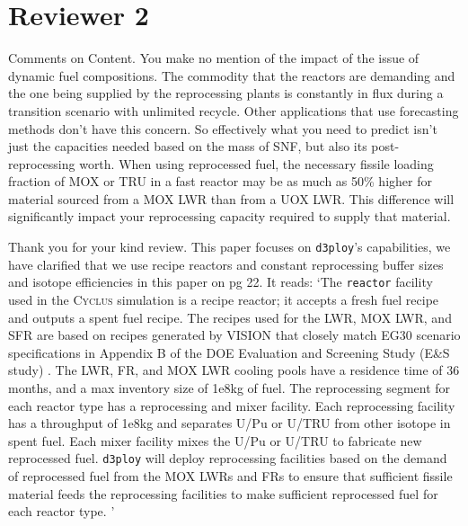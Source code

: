 \documentclass[answers,11pt]{exam}
\newcommand{\Cyclus}{\textsc{Cyclus}\xspace}%
\newcommand{\deploy}{\texttt{d3ploy}\xspace}%
\begin{document}
\section*{Reviewer 2}
\begin{questions}

\question Comments on Content.
You make no mention of the impact of the issue of dynamic fuel compositions. 
The commodity that the reactors are demanding and the one being supplied 
by the reprocessing plants is constantly in flux during a transition 
scenario with unlimited recycle. Other applications that use forecasting 
methods don't have this concern.  So effectively what you need to predict 
isn't just the capacities needed based on the mass of SNF, but also its 
post-reprocessing worth. When using reprocessed fuel, the necessary fissile 
loading fraction of MOX or TRU in a fast reactor may be as much as 50\% 
higher for material sourced from a MOX LWR than from a UOX LWR. 
This difference will significantly impact your reprocessing capacity 
required to supply that material.

\begin{solution}
Thank you for your kind review.
This paper focuses on \deploy's capabilities, we have clarified that we use recipe reactors 
and constant reprocessing buffer sizes and isotope efficiencies in this paper on pg 22. It reads: 
`The \texttt{reactor} facility used in the \Cyclus simulation 
is a recipe reactor; it accepts a fresh fuel recipe and outputs 
a spent fuel recipe. 
The recipes used for the LWR, MOX LWR, and 
SFR are based on recipes generated by VISION 
\cite{bae_arfctransition-scenarios_2019}
that closely match EG30 scenario specifications in 
Appendix B of the DOE Evaluation and Screening Study 
(E\&S study) \cite{wigeland_nuclear_2014}. 
The LWR, FR, and MOX LWR cooling pools have a residence time of 36 months, and a max 
inventory size of 1e8kg of fuel. 
The reprocessing segment for each reactor type has a reprocessing and mixer facility. 
Each reprocessing facility has a throughput of 1e8kg and separates U/Pu or U/TRU from 
other isotope in spent fuel. 
Each mixer facility mixes the U/Pu or U/TRU to fabricate new reprocessed fuel.  
\deploy will deploy reprocessing facilities based on the demand of reprocessed fuel 
from the MOX LWRs and FRs to ensure that sufficient fissile material 
feeds the reprocessing facilities to make sufficient reprocessed fuel 
for each reactor type. ' 


\end{solution}
\end{questions}
\end{document}
